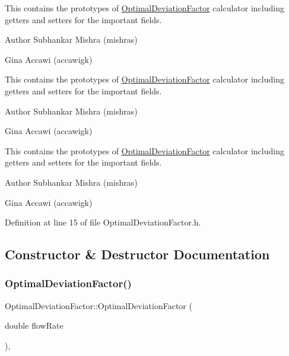 This contains the prototypes of \hyperlink{class_optimal_deviation_factor}{Optimal\+Deviation\+Factor} calculator including getters and setters for the important fields.

\begin{DoxyAuthor}{Author}
Subhankar Mishra (mishras) 

Gina Accawi (accawigk) 
\end{DoxyAuthor}


This contains the prototypes of \hyperlink{class_optimal_deviation_factor}{Optimal\+Deviation\+Factor} calculator including getters and setters for the important fields.

\begin{DoxyAuthor}{Author}
Subhankar Mishra (mishras) 

Gina Accawi (accawigk) 
\end{DoxyAuthor}


This contains the prototypes of \hyperlink{class_optimal_deviation_factor}{Optimal\+Deviation\+Factor} calculator including getters and setters for the important fields.

\begin{DoxyAuthor}{Author}
Subhankar Mishra (mishras) 

Gina Accawi (accawigk) 
\end{DoxyAuthor}


Definition at line 15 of file Optimal\+Deviation\+Factor.\+h.



\subsection{Constructor \& Destructor Documentation}
\mbox{\label{class_optimal_deviation_factor_a61e6acfd31d44bc1f2f622407ba1e857}} 
\subsubsection{\texorpdfstring{Optimal\+Deviation\+Factor()}{OptimalDeviationFactor()}\hspace{0.1cm}{\footnotesize\ttfamily [1/3]}}
{\footnotesize\ttfamily Optimal\+Deviation\+Factor\+::\+Optimal\+Deviation\+Factor (\begin{DoxyParamCaption}\item[{double}]{flow\+Rate }\end{DoxyParamCaption})\hspace{0.3cm}{\ttfamily [inline]}, {\ttfamily [explicit]}}

